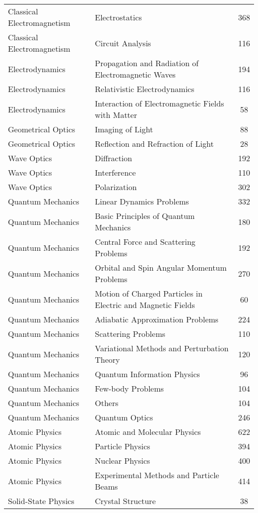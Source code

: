 \begin{table}[hbp]
{\begin{tabular}[tbp]{lp{8cm}c}
Classical Electromagnetism & Electrostatics & 368 \\ 
Classical Electromagnetism & Circuit Analysis & 116 \\ 
\hline
Electrodynamics & Propagation and Radiation of Electromagnetic Waves & 194 \\ 
Electrodynamics & Relativistic Electrodynamics & 116 \\ 
Electrodynamics & Interaction of Electromagnetic Fields with Matter & 58 \\ 
\hline
Geometrical Optics & Imaging of Light & 88 \\ 
Geometrical Optics & Reflection and Refraction of Light & 28 \\ 
\hline
Wave Optics & Diffraction & 192 \\ 
Wave Optics & Interference & 110 \\ 
Wave Optics & Polarization & 302 \\ 
\hline
Quantum Mechanics & Linear Dynamics Problems & 332 \\ 
Quantum Mechanics & Basic Principles of Quantum Mechanics & 180 \\ 
Quantum Mechanics & Central Force and Scattering Problems & 192 \\ 
Quantum Mechanics & Orbital and Spin Angular Momentum Problems & 270 \\ 
Quantum Mechanics & Motion of Charged Particles in Electric and Magnetic Fields & 60 \\ 
Quantum Mechanics & Adiabatic Approximation Problems & 224 \\ 
Quantum Mechanics & Scattering Problems & 110 \\ 
Quantum Mechanics & Variational Methods and Perturbation Theory & 120 \\ 
Quantum Mechanics & Quantum Information Physics & 96 \\ 
Quantum Mechanics & Few-body Problems & 104 \\ 
Quantum Mechanics & Others & 104 \\ 
Quantum Mechanics & Quantum Optics & 246 \\ 
\hline
Atomic Physics & Atomic and Molecular Physics & 622 \\ 
Atomic Physics & Particle Physics & 394 \\ 
Atomic Physics & Nuclear Physics & 400 \\ 
Atomic Physics & Experimental Methods and Particle Beams & 414 \\ 
\hline
Solid-State Physics & Crystal Structure & 38 \\ 

\end{tabular}}
\end{table}
